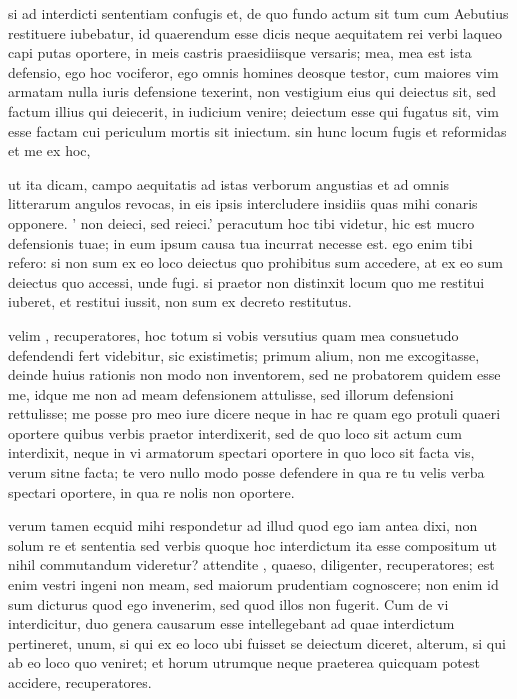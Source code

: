  si ad interdicti sententiam confugis et, de quo fundo actum sit tum cum Aebutius restituere iubebatur, id quaerendum esse dicis neque aequitatem rei verbi laqueo capi putas oportere, in meis castris praesidiisque versaris; mea, mea est ista defensio, ego hoc vociferor, ego omnis homines deosque testor, cum maiores vim armatam nulla iuris defensione texerint, non vestigium eius qui deiectus sit, sed factum illius qui deiecerit, in iudicium venire; deiectum esse qui fugatus sit, vim esse factam cui periculum mortis sit iniectum. sin hunc locum fugis et reformidas et me ex hoc,

 ut ita dicam, campo aequitatis ad istas verborum angustias et ad omnis litterarum angulos revocas, in eis ipsis intercludere insidiis quas mihi conaris opponere. ' non deieci, sed reieci.' peracutum hoc tibi videtur, hic est mucro defensionis tuae; in eum ipsum causa tua incurrat necesse est. ego enim tibi refero: si non sum ex eo loco deiectus quo prohibitus sum accedere, at ex eo sum deiectus quo accessi, unde fugi. si praetor non distinxit locum quo me restitui iuberet, et restitui iussit, non sum ex decreto restitutus.

 velim , recuperatores, hoc totum si vobis versutius quam mea consuetudo defendendi fert videbitur, sic existimetis; primum alium, non me excogitasse, deinde huius rationis non modo non inventorem, sed ne probatorem quidem esse me, idque me non ad meam defensionem attulisse, sed illorum defensioni rettulisse; me posse pro meo iure dicere neque in hac re quam ego protuli quaeri oportere quibus verbis praetor interdixerit, sed de quo loco sit actum cum interdixit, neque in vi armatorum spectari oportere in quo loco sit facta vis, verum sitne facta; te vero nullo modo posse defendere in qua re tu velis verba spectari oportere, in qua re nolis non oportere.

 verum tamen ecquid mihi respondetur ad illud quod ego iam antea dixi, non solum re et sententia sed verbis quoque hoc interdictum ita esse compositum ut nihil commutandum videretur? attendite , quaeso, diligenter, recuperatores; est enim vestri ingeni non meam, sed maiorum prudentiam cognoscere; non enim id sum dicturus quod ego invenerim, sed quod illos non fugerit. Cum de vi interdicitur, duo genera causarum esse intellegebant ad quae interdictum pertineret, unum, si qui ex eo loco ubi fuisset se deiectum diceret, alterum, si qui ab eo loco quo veniret; et horum utrumque neque praeterea quicquam potest accidere, recuperatores.

